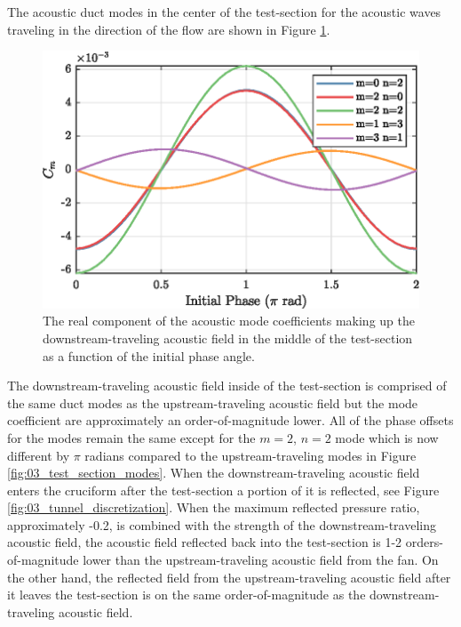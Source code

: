 The acoustic duct modes in the center of the test-section for the acoustic waves traveling in the direction of the flow are shown in Figure \ref{fig:03_test_section_modes_with}.
\begin{figure}
  \centering
  \includegraphics{../matlab/03_aero_optics_acoustics/tunnel_acoustic_with_0.6_8_0.eps}
  \caption{The real component of the acoustic mode coefficients making up the downstream-traveling acoustic field in the middle of the test-section as a function of the initial phase angle.}
  \label{fig:03_test_section_modes_with}
\end{figure}
The downstream-traveling acoustic field inside of the test-section is comprised of the same duct modes as the upstream-traveling acoustic field but the mode coefficient are approximately an order-of-magnitude lower.
All of the phase offsets for the modes remain the same except for the $m=2$, $n=2$ mode which is now different by $\pi$ radians compared to the upstream-traveling modes in Figure \ref{fig:03_test_section_modes}.
When the downstream-traveling acoustic field enters the cruciform after the test-section a portion of it is reflected, see Figure \ref{fig:03_tunnel_discretization}.
When the maximum reflected pressure ratio, approximately -0.2, is combined with the strength of the downstream-traveling acoustic field, the acoustic field reflected back into the test-section is 1-2 orders-of-magnitude lower than the upstream-traveling acoustic field from the fan.
On the other hand, the reflected field from the upstream-traveling acoustic field after it leaves the test-section is on the same order-of-magnitude as the downstream-traveling acoustic field.

